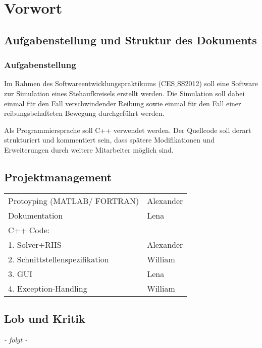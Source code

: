 \chapter{Vorwort}
\label{ch:1}

\section{Aufgabenstellung und Struktur des Dokuments}
\label{sec:1.1}

\subsection*{Aufgabenstellung}

{Im Rahmen des Softwareentwicklungspraktikums (CES$\_$SS2012) soll eine Software zur Simulation eines Stehaufkreisels erstellt werden.
Die Simulation soll dabei einmal f\"ur den Fall verschwindender
Reibung sowie einmal für den Fall einer reibungsbehafteten Bewegung durchgef\"uhrt werden. 

Als Programmiersprache soll C++ verwendet werden. Der Quellcode soll derart strukturiert
und kommentiert sein, dass sp\"atere Modifikationen und Erweiterungen durch weitere
Mitarbeiter m\"oglich sind.}

\section{Projektmanagement}
\label{sec:1.2}

{\em 
\begin{tabular}{l l}
	Protoyping (MATLAB/ FORTRAN)& Alexander \\
	Dokumentation &Lena \\
	C++ Code:& \\
	1. Solver+RHS& Alexander\\
	2. Schnittstellenspezifikation & William\\
	3. GUI & Lena \\
	4. Exception-Handling & William\\
\end{tabular}
}

\section{Lob und Kritik}
\label{sec:1.3}

{\em - folgt -}

